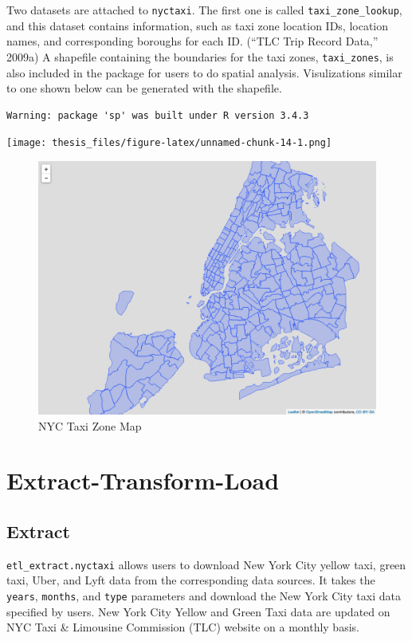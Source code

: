 \documentclass[12pt,twoside]{reedthesis}
\theoremstyle{definition}
\theoremstyle{definition}
\theoremstyle{definition}
\theoremstyle{remark}
\begin{document}
Two datasets are attached to \texttt{nyctaxi}. The first one is called
\texttt{taxi\_zone\_lookup}, and this dataset contains information, such
as taxi zone location IDs, location names, and corresponding boroughs
for each ID. (``TLC Trip Record Data,'' 2009a) A shapefile containing
the boundaries for the taxi zones, \texttt{taxi\_zones}, is also
included in the package for users to do spatial analysis. Visulizations
similar to one shown below can be generated with the shapefile.
\begin{verbatim}
Warning: package 'sp' was built under R version 3.4.3
\end{verbatim}
\texttt{[image: thesis\_files/figure-latex/unnamed-chunk-14-1.png]}
\begin{figure}

{\centering \includegraphics[width=4.96in]{figure/zonemap} 

}

\caption{NYC Taxi Zone Map}\label{fig:map}
\end{figure}
\section{Extract-Transform-Load}\label{extract-transform-load}

\subsection{Extract}\label{extract}

\texttt{etl\_extract.nyctaxi} allows users to download New York City
yellow taxi, green taxi, Uber, and Lyft data from the corresponding data
sources. It takes the \texttt{years}, \texttt{months}, and \texttt{type}
parameters and download the New York City taxi data specified by users.
New York City Yellow and Green Taxi data are updated on NYC Taxi \&
Limousine Commission (TLC) website on a monthly basis.
\end{document}
